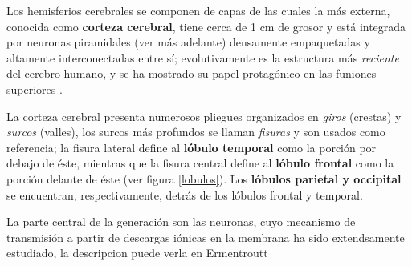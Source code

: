 Los hemisferios cerebrales se componen de capas de las cuales la más externa, conocida como
\textbf{corteza cerebral}, tiene cerca de 1 cm de grosor y está integrada por neuronas piramidales 
(ver más adelante) densamente empaquetadas y altamente interconectadas entre sí; evolutivamente es 
la estructura más \textit{reciente} del cerebro humano, y se ha mostrado su papel protagónico en 
las funiones superiores \cite{Clark98_2}.

La corteza cerebral presenta numerosos pliegues organizados en \textit{giros} (crestas) y
\textit{surcos} (valles), los surcos más profundos se llaman \textit{fisuras} y son usados como 
referencia; la fisura lateral define al \textbf{lóbulo temporal} como la porción por debajo de 
éste, mientras que la fisura central define al \textbf{lóbulo frontal} como la porción delante de 
éste (ver figura \ref{lobulos}). Los \textbf{lóbulos parietal y occipital} se encuentran, 
respectivamente, detrás de los lóbulos frontal y temporal.




La parte central de la generación son las neuronas, cuyo mecanismo de transmisión a partir de
descargas iónicas en la membrana ha sido extendsamente estudiado, la descripcion puede verla en
Ermentroutt


